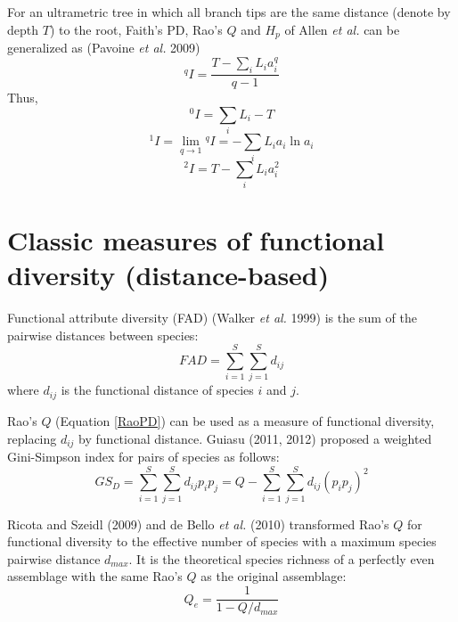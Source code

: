 \documentclass[11pt]{article}
\begin{document}
For an ultrametric tree in which all branch tips are the same distance (denote by depth $T$) to the root, Faith's PD, Rao's $Q$ and $H_p$ of Allen \textit{et al.} can be generalized as (Pavoine \textit{et al.} 2009)
\begin{equation}
    ^{q}I = \frac{T-\sum\limits_{i}L_ia_i^q}{q-1}
    \label{GeneralizedPD}
\end{equation}
Thus,
\begin{equation}
    ^{0}I = \sum\limits_{i}L_i - T
\end{equation}
\begin{equation}
    ^{1}I = \lim_{q\rightarrow 1} {^{q}I} = -\sum\limits_{i}L_ia_i\ln a_i
\end{equation}
\begin{equation}
    ^{2}I = T-\sum\limits_{i}L_i a_i^2
\end{equation}

\section{Classic measures of functional diversity (distance-based)}
Functional attribute diversity (FAD) (Walker \textit{et al.} 1999) is the sum of the pairwise distances between species: 
\begin{equation}
    FAD = \sum\limits_{i=1}^{S}\sum\limits_{j=1}^{S}d_{ij}
    \label{FAD}
\end{equation}
where $d_{ij}$ is the functional distance of species $i$ and $j$.

\newline

Rao's $Q$ (Equation \ref{RaoPD}) can be used as a measure of functional diversity, replacing $d_{ij}$ by functional distance. 
Guiasu (2011, 2012) proposed a weighted Gini-Simpson index for pairs of species as follows:
\begin{equation}
    GS_D = \sum\limits_{i=1}^{S}\sum\limits_{j=1}^{S}d_{ij}p_ip_j = Q-\sum\limits_{i=1}^{S}\sum\limits_{j=1}^{S}d_{ij}(p_ip_j)^2
    \label{Guiasu}
\end{equation}

\newline

Ricota and Szeidl (2009) and de Bello \textit{et al.} (2010) transformed Rao's $Q$ for functional diversity to the effective number of species with a maximum species pairwise distance $d_{max}$. 
It is the theoretical species richness of a perfectly even assemblage with the same Rao's $Q$ as the original assemblage:
\begin{equation}
    Q_e = \frac{1}{1-Q/d_{max}}
    \label{EffectiveRichnessQ}
\end{equation}
\end{document}
